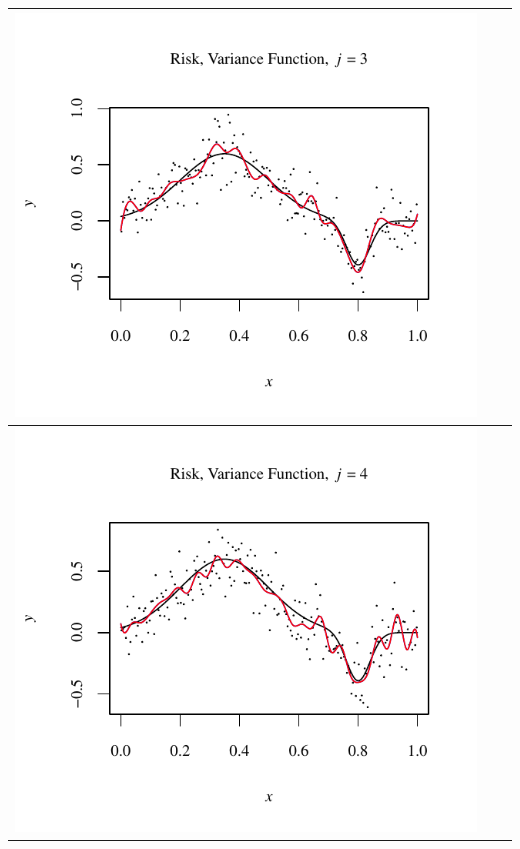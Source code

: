 \documentclass[11pt]{article}
\begin{document}
\begin{table}[h!]
\begin{center}
\begin{tabular}{| >{\centering\arraybackslash}m{2.1in} |  >{\centering\arraybackslash}m{2.1in} |  >{\centering\arraybackslash}m{2.1in}|}
      \includegraphics[width=1\linewidth,height=0.18\textheight]{Graphs/4/4/assignment5_a_4_4_3}\\\hline
      \includegraphics[width=1\linewidth,height=0.18\textheight]{Graphs/4/4/assignment5_a_4_4_4}&

\end{tabular}
\end{center}
\end{table}
\end{document}
